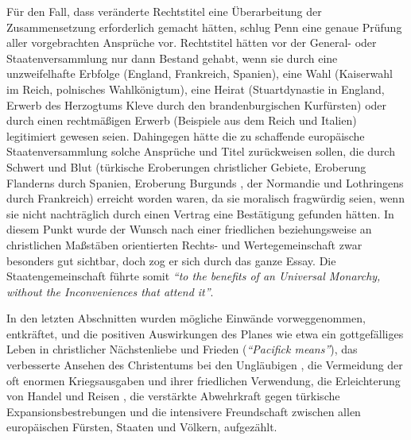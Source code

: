 \medskip

Für den Fall, dass veränderte Rechtstitel eine Überarbeitung der Zusammensetzung
erforderlich gemacht hätten, schlug Penn eine genaue Prüfung aller vorgebrachten
Ansprüche vor. Rechtstitel hätten vor der General- oder Staatenversammlung nur
dann Bestand gehabt, wenn sie durch eine unzweifelhafte Erbfolge (England,
Frankreich, Spanien), eine Wahl (Kaiserwahl im Reich, polnisches Wahlkönigtum),
eine Heirat (Stuartdynastie in England, Erwerb des Herzogtums
Kleve durch den brandenburgischen Kurfürsten) oder durch einen rechtmäßigen
Erwerb (Beispiele aus dem Reich und Italien) legitimiert gewesen seien.
Dahingegen hätte die zu schaffende europäische Staatenversammlung solche
Ansprüche und Titel zurückweisen sollen, die durch Schwert und Blut (türkische
Eroberungen christlicher Gebiete, Eroberung Flanderns  durch Spanien, Eroberung
Burgunds , der Normandie und Lothringens  durch Frankreich) erreicht worden waren,
da sie moralisch fragwürdig seien, wenn sie nicht nachträglich durch einen
Vertrag eine Bestätigung gefunden hätten. In diesem Punkt wurde der Wunsch nach
einer friedlichen beziehungsweise an christlichen Maßstäben orientierten Rechts-
und Wertegemeinschaft zwar besonders gut sichtbar, doch zog er sich durch das
ganze Essay. Die Staatengemeinschaft führte somit \textit{"`to the benefits of an
Universal Monarchy, without the Inconveniences that attend it"'}.

\medskip

In den letzten Abschnitten wurden mögliche Einwände vorweggenommen, entkräftet,
und die positiven Auswirkungen des Planes wie etwa ein gottgefälliges Leben in
christlicher Nächstenliebe und Frieden (\textit{"`Pacifick means"'}), das verbesserte
Ansehen des Christentums  bei den Ungläubigen , die Vermeidung der oft enormen
Kriegsausgaben und ihrer friedlichen Verwendung, die Erleichterung von Handel 
und Reisen , die verstärkte Abwehrkraft gegen türkische Expansionsbestrebungen 
und die intensivere Freundschaft zwischen allen europäischen Fürsten, Staaten
und Völkern, aufgezählt.

\medskip

